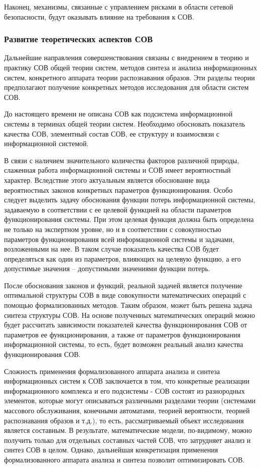 Наконец, механизмы, связанные с управлением рисками в области сетевой безопасности, 
будут оказывать влияние на требования к СОВ.



\subsubsection{Развитие теоретических аспектов СОВ}

Дальнейшие направления совершенствования связаны с внедрением в теорию и практику СОВ 
общей теории систем, методов синтеза и анализа информационных систем, конкретного аппарата 
теории распознавания образов. Эти разделы теории предполагают получение конкретных методов 
исследования для области систем СОВ.

До настоящего времени не описана СОВ как подсистема информационной системы в терминах 
общей теории систем. Необходимо обосновать показатель качества СОВ, элементный состав 
СОВ, ее структуру и взаимосвязи с информационной системой.

В связи с наличием значительного количества факторов различной природы, слаженная работа 
информационной системы и СОВ имеет вероятностный характер. Вследствие этого актуальным 
является обоснование вида вероятностных законов конкретных параметров функционирования. 
Особо следует выделить задачу обоснования функции потерь информационной системы, задаваемую 
в соответствии с ее целевой функцией на области параметров функционирования системы. 
При этом целевая функция должна быть определена не только на экспертном уровне, но и в 
соответствии с совокупностью параметров функционирования всей информационной системы и 
задачами, возложенными на нее. В таком случае показатель качества СОВ будет определяться 
как один из параметров, влияющих на целевую функцию, а его допустимые значения -- 
допустимыми значениями функции потерь.

После обоснования законов и функций, реальной задачей является получение оптимальной 
структуры СОВ в виде совокупности математических операций с помощью формализованных 
методов. Таким образом, может быть решена задача синтеза структуры СОВ. На основе 
полученных математических операций можно будет рассчитать зависимости показателей 
качества функционирования СОВ от параметров ее функционирования, а также от параметров 
функционирования информационной системы, то есть, будет возможен реальный анализ качества 
функционирования СОВ.

Сложность применения формализованного аппарата анализа и синтеза информационных систем 
к СОВ заключается в том, что конкретные реализации информационного комплекса и его 
подсистемы - СОВ состоят из разнородных элементов, которые могут описываться различными 
разделами теории (системами массового обслуживания, конечными автоматами, теорией 
вероятности, теорией распознавания образов и т.д.), то есть, рассматриваемый объект 
исследования является составным. В результате, математические модели, по-видимому, 
можно получить только для отдельных составных частей СОВ, что затрудняет анализ и 
синтез СОВ в целом. Однако, дальнейшая конкретизация применения формализованного 
аппарата анализа и синтеза позволит оптимизировать СОВ.

